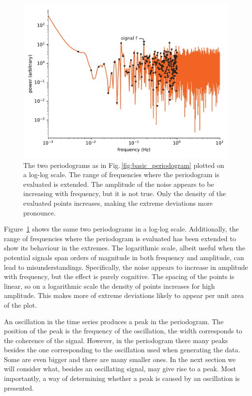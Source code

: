 \begin{figure}
  \centering
  \includegraphics[width=\linewidth]{gfx/axions/basic_periodogram_loglog.pdf}
  \caption{The two periodograms as in Fig.\,\ref{fig:basic_periodogram} plotted on a log-log scale. The range of frequencies where the periodogram is evaluated is extended. The amplitude of the noise appears to be increasing with frequency, but it is not true. Only the density of the evaluated points increases, making the extreme deviations more pronounce.}\label{fig:basic_periodogram_loglog}
\end{figure}

Figure~\ref{fig:basic_periodogram_loglog} shows the same two periodograms in a log-log scale. Additionally, the range of frequencies where the periodogram is evaluated has been extended to show its behaviour in the extremes. The logarithmic scale, albeit useful when the potential signals span orders of magnitude in both frequency and amplitude, can lead to misunderstandings. Specifically, the noise appears to increase in amplitude with frequency, but the effect is purely cognitive. The spacing of the points is linear, so on a logarithmic scale the density of points increases for high amplitude. This makes more of extreme deviations likely to appear per unit area of the plot.%

An oscillation in the time series produces a peak in the periodogram. The position of the peak is the frequency of the oscillation, the width corresponds to the coherence of the signal. However, in the periodogram there many peaks besides the one corresponding to the oscillation used when generating the data. Some are even bigger and there are many smaller ones. In the next section we will consider what, besides an oscillating signal, may give rise to a peak. Most importantly, a way of determining whether a peak is caused by an oscillation is presented.




